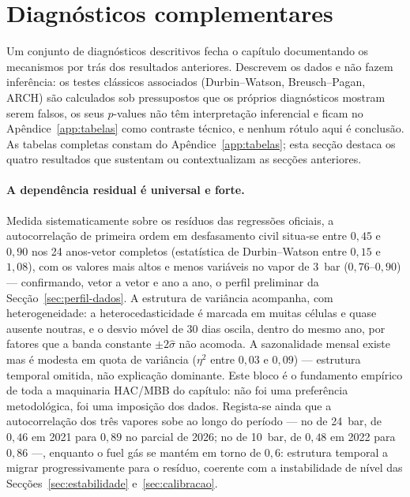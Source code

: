\section{Diagnósticos complementares}
\label{sec:diagnosticos-desc}


Um conjunto de diagnósticos descritivos fecha o capítulo documentando os
mecanismos por trás dos resultados anteriores. Descrevem os dados e
não fazem inferência: os testes clássicos associados (Durbin--Watson,
Breusch--Pagan, ARCH) são calculados sob pressupostos que os próprios
diagnósticos mostram serem falsos, os seus $p$-values não têm interpretação
inferencial e ficam no Apêndice~\ref{app:tabelas} como contraste técnico, e
nenhum rótulo aqui é conclusão. As tabelas completas constam do Apêndice~\ref{app:tabelas};
esta secção destaca os quatro resultados que sustentam ou contextualizam as
secções anteriores.

\paragraph{A dependência residual é universal e forte.} Medida
sistematicamente sobre os resíduos das regressões oficiais, a autocorrelação
de primeira ordem em desfasamento civil situa-se entre $0{,}45$ e $0{,}90$
nos 24 anos-vetor completos (estatística de Durbin--Watson entre $0{,}15$ e
$1{,}08$), com os valores mais altos e menos variáveis no vapor de 3~bar
($0{,}76$--$0{,}90$) --- confirmando, vetor a vetor e ano a ano, o perfil
preliminar da Secção~\ref{sec:perfil-dados}. A estrutura de variância acompanha,
com heterogeneidade: a heterocedasticidade é marcada em muitas células e quase
ausente noutras, e o desvio móvel de 30 dias oscila, dentro do mesmo
ano, por fatores que a banda constante $\pm 2\hat\sigma$ não acomoda. A sazonalidade mensal existe mas é
modesta em quota de variância ($\eta^2$ entre $0{,}03$ e $0{,}09$) ---
estrutura temporal omitida, não explicação dominante. Este bloco é o
fundamento empírico de toda a maquinaria HAC/MBB do capítulo: não foi uma
preferência metodológica, foi uma imposição dos dados. Regista-se ainda que
a autocorrelação dos três vapores sobe ao longo do período --- no de
24~bar, de $0{,}46$ em 2021 para $0{,}89$ no parcial de 2026; no de 10~bar,
de $0{,}48$ em 2022 para $0{,}86$ ---, enquanto o fuel gás se mantém em
torno de $0{,}6$: estrutura temporal a migrar progressivamente para o
resíduo, coerente com a instabilidade de nível das
Secções~\ref{sec:estabilidade} e~\ref{sec:calibracao}.

